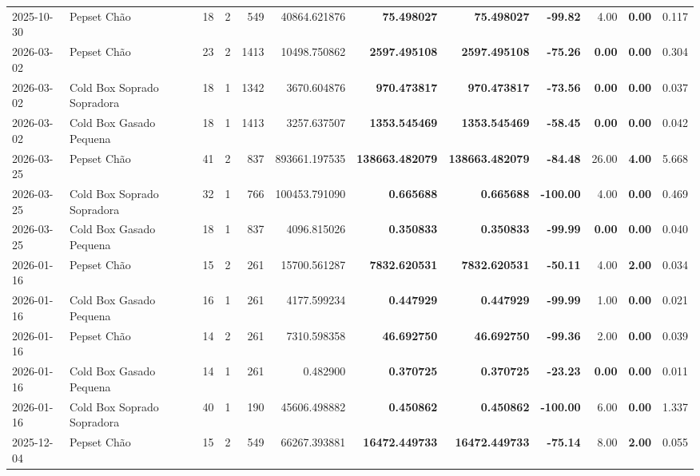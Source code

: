 {\begin{center}
{\begin{tabular}{@{}llrrrrrrrrrr@{}}
2025-10-30 & Pepset Chão & 18 & 2 & 549 & 40864.621876 & \textbf{75.498027} & \textbf{75.498027} & \textbf{-99.82} & 4.00 & \textbf{0.00} & 0.117 \\
2026-03-02 & Pepset Chão & 23 & 2 & 1413 & 10498.750862 & \textbf{2597.495108} & \textbf{2597.495108} & \textbf{-75.26} & \textbf{0.00} & \textbf{0.00} & 0.304 \\
2026-03-02 & Cold Box Soprado Sopradora & 18 & 1 & 1342 & 3670.604876 & \textbf{970.473817} & \textbf{970.473817} & \textbf{-73.56} & \textbf{0.00} & \textbf{0.00} & 0.037 \\
2026-03-02 & Cold Box Gasado Pequena & 18 & 1 & 1413 & 3257.637507 & \textbf{1353.545469} & \textbf{1353.545469} & \textbf{-58.45} & \textbf{0.00} & \textbf{0.00} & 0.042 \\
2026-03-25 & Pepset Chão & 41 & 2 & 837 & 893661.197535 & \textbf{138663.482079} & \textbf{138663.482079} & \textbf{-84.48} & 26.00 & \textbf{4.00} & 5.668 \\
2026-03-25 & Cold Box Soprado Sopradora & 32 & 1 & 766 & 100453.791090 & \textbf{0.665688} & \textbf{0.665688} & \textbf{-100.00} & 4.00 & \textbf{0.00} & 0.469 \\
2026-03-25 & Cold Box Gasado Pequena & 18 & 1 & 837 & 4096.815026 & \textbf{0.350833} & \textbf{0.350833} & \textbf{-99.99} & \textbf{0.00} & \textbf{0.00} & 0.040 \\
2026-01-16 & Pepset Chão & 15 & 2 & 261 & 15700.561287 & \textbf{7832.620531} & \textbf{7832.620531} & \textbf{-50.11} & 4.00 & \textbf{2.00} & 0.034 \\
2026-01-16 & Cold Box Gasado Pequena & 16 & 1 & 261 & 4177.599234 & \textbf{0.447929} & \textbf{0.447929} & \textbf{-99.99} & 1.00 & \textbf{0.00} & 0.021 \\
2026-01-16 & Pepset Chão & 14 & 2 & 261 & 7310.598358 & \textbf{46.692750} & \textbf{46.692750} & \textbf{-99.36} & 2.00 & \textbf{0.00} & 0.039 \\
2026-01-16 & Cold Box Gasado Pequena & 14 & 1 & 261 & 0.482900 & \textbf{0.370725} & \textbf{0.370725} & \textbf{-23.23} & \textbf{0.00} & \textbf{0.00} & 0.011 \\
2026-01-16 & Cold Box Soprado Sopradora & 40 & 1 & 190 & 45606.498882 & \textbf{0.450862} & \textbf{0.450862} & \textbf{-100.00} & 6.00 & \textbf{0.00} & 1.337 \\
2025-12-04 & Pepset Chão & 15 & 2 & 549 & 66267.393881 & \textbf{16472.449733} & \textbf{16472.449733} & \textbf{-75.14} & 8.00 & \textbf{2.00} & 0.055 \\

\end{tabular}}
\end{center}}
